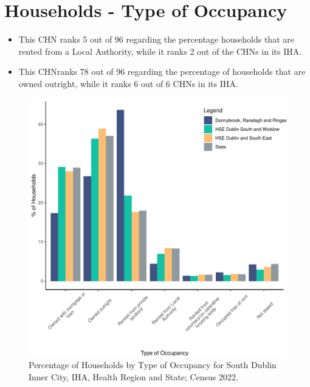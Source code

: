 \documentclass{article}
\begin{document}
\section{Households - Type of Occupancy}\label{sect:Households}
\begin{itemize}
\item This CHN ranks  5 out of 96 regarding the percentage households that are rented from a Local Authority, while it ranks  2 out of the CHNs in its IHA. 
\item This CHNranks  78 out of 96 regarding the percentage of households that are owned outright, while it ranks   6 out of 6 CHNs in its IHA.
\end{itemize}
\begin{figure}[H]
	\centering
	\includegraphics[width = 140mm]{../figures/HouseholdsED.pdf}
	\caption{Percentage of Households by Type of Occupancy for South Dublin Inner City, IHA, Health Region and State; Census 2022.}
	\label{fig:vbnv}
	\end{figure}
\end{document}

